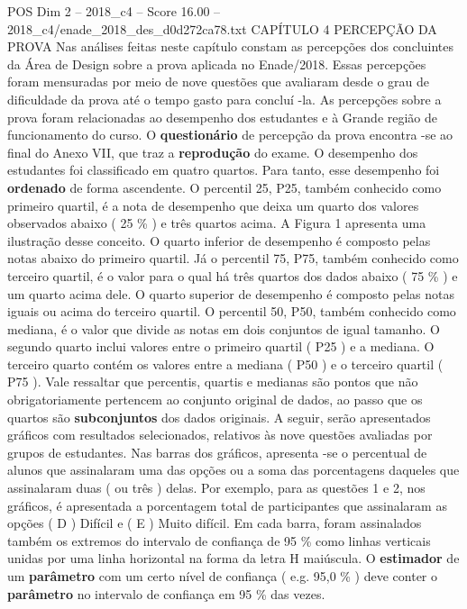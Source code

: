 \begin{textsample}{POS Dim 2 – 2018\_c4 – Score 16.00 – 2018\_c4/enade\_2018\_des\_d0d272ca78.txt}  \label{ex:f2_pos_059}
CAPÍTULO 4 PERCEPÇÃO DA PROVA Nas análises feitas neste capítulo constam as percepções dos concluintes da Área de Design sobre a prova aplicada no Enade/2018.
Essas percepções foram mensuradas por meio de nove questões que avaliaram desde o grau de dificuldade da prova até o tempo gasto para concluí -la.
As percepções sobre a prova foram relacionadas ao desempenho dos estudantes e à Grande região de funcionamento do curso.
O \textbf{questionário} de percepção da prova encontra -se ao final do Anexo VII, que traz a \textbf{reprodução} do exame.
O desempenho dos estudantes foi classificado em quatro quartos.
Para tanto, esse desempenho foi \textbf{ordenado} de forma ascendente.
O percentil 25, P25, também conhecido como primeiro quartil, é a nota de desempenho que deixa um quarto dos valores observados abaixo ( 25 \% ) e três quartos acima.
A Figura 1 apresenta uma ilustração desse conceito.
O quarto inferior de desempenho é composto pelas notas abaixo do primeiro quartil.
Já o percentil 75, P75, também conhecido como terceiro quartil, é o valor para o qual há três quartos dos dados abaixo ( 75 \% ) e um quarto acima dele.
O quarto superior de desempenho é composto pelas notas iguais ou acima do terceiro quartil.
O percentil 50, P50, também conhecido como mediana, é o valor que divide as notas em dois conjuntos de igual tamanho.
O segundo quarto inclui valores entre o primeiro quartil ( P25 ) e a mediana.
O terceiro quarto contém os valores entre a mediana ( P50 ) e o terceiro quartil ( P75 ).
Vale ressaltar que percentis, quartis e medianas são pontos que não obrigatoriamente pertencem ao conjunto original de dados, ao passo que os quartos são \textbf{subconjuntos} dos dados originais.
A seguir, serão apresentados gráficos com resultados selecionados, relativos às nove questões avaliadas por grupos de estudantes.
Nas barras dos gráficos, apresenta -se o percentual de alunos que assinalaram uma das opções ou a soma das porcentagens daqueles que assinalaram duas ( ou três ) delas.
Por exemplo, para as questões 1 e 2, nos gráficos, é apresentada a porcentagem total de participantes que assinalaram as opções ( D ) Difícil e ( E ) Muito difícil.
Em cada barra, foram assinalados também os extremos do intervalo de confiança de 95 \% como linhas verticais unidas por uma linha horizontal na forma da letra H maiúscula.
O \textbf{estimador} de um \textbf{parâmetro} com um certo nível de confiança ( e.g. 95,0 \% ) deve conter o \textbf{parâmetro} no intervalo de confiança em 95 \% das vezes.

\end{textsample}
